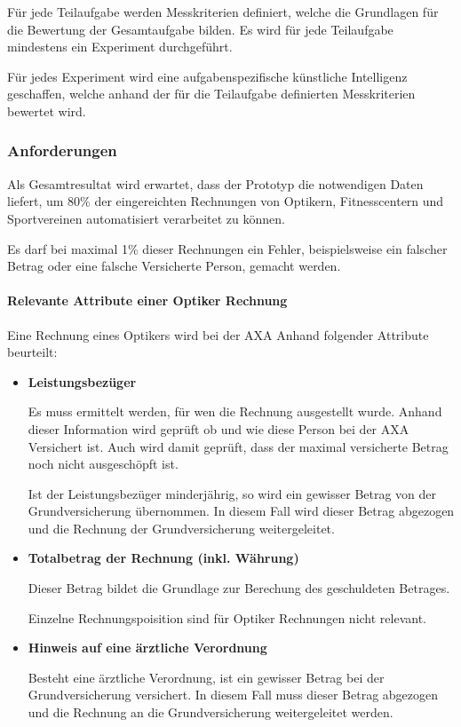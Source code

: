 Für jede Teilaufgabe werden Messkriterien definiert, welche die Grundlagen für die Bewertung der Gesamtaufgabe bilden. Es wird für jede Teilaufgabe mindestens ein Experiment durchgeführt.

Für jedes Experiment wird eine aufgabenspezifische künstliche Intelligenz geschaffen, welche anhand der für die Teilaufgabe definierten Messkriterien bewertet wird.

\subsubsection{Anforderungen}

Als Gesamtresultat wird erwartet, dass der Prototyp die notwendigen Daten liefert, um 80\% der eingereichten Rechnungen von Optikern, Fitnesscentern und Sportvereinen automatisiert verarbeitet zu können. 

Es darf bei maximal 1\% dieser Rechnungen ein Fehler, beispielsweise ein falscher Betrag oder eine falsche Versicherte Person, gemacht werden.

\paragraph{
    \textbf{Relevante Attribute einer Optiker Rechnung}
}


Eine Rechnung eines Optikers wird bei der AXA Anhand folgender Attribute beurteilt:

\begin{itemize}
    \item \textbf{Leistungsbezüger}
    
    Es muss ermittelt werden, für wen die Rechnung ausgestellt wurde. Anhand dieser Information wird geprüft ob und wie diese Person bei der AXA Versichert ist. Auch wird damit geprüft, dass der maximal versicherte Betrag noch nicht ausgeschöpft ist.
    
    Ist der Leistungsbezüger minderjährig, so wird ein gewisser Betrag von der Grundversicherung übernommen. In diesem Fall wird dieser Betrag abgezogen und die Rechnung der Grundversicherung weitergeleitet.
    \item \textbf{Totalbetrag der Rechnung (inkl. Währung)}
    
    Dieser Betrag bildet die Grundlage zur Berechung des geschuldeten Betrages. 
    
    Einzelne Rechnungspoisition sind für Optiker Rechnungen nicht relevant.
    \item \textbf{Hinweis auf eine ärztliche Verordnung}
    
    Besteht eine ärztliche Verordnung, ist ein gewisser Betrag bei der Grundversicherung versichert. In diesem Fall muss dieser Betrag abgezogen und die Rechnung an die Grundversicherung weitergeleitet werden.
\end{itemize}

